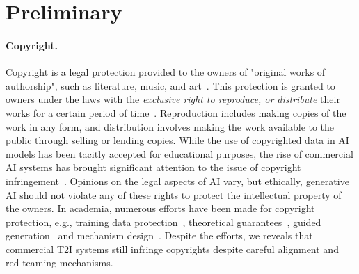 \vspace{-0.1in}
\section{Preliminary}
\vspace{-0.1in}
\paragraph{Copyright.}
Copyright is a legal protection provided to the owners of "original works of authorship", such as literature, music, and art~\citep{uscopyright2024uscopyright, uspto2024copyright}. This protection is granted to owners under the laws with the \textit{exclusive right to reproduce, or distribute} their works for a certain period of time~\citep{cornell106, uscopyright2024uscopyright}. Reproduction includes making copies of the work in any form, and distribution involves making the work available to the public through selling or lending copies. While the use of copyrighted data in AI models has been tacitly accepted for educational purposes, the rise of commercial AI systems has brought significant attention to the issue of copyright infringement~\citep{lawsuit1,lawsuit2NYTimes,lawsuit3Getty}. Opinions on the legal aspects of AI vary, but ethically, generative AI should not violate any of these rights to protect the intellectual property of the owners. 
In academia, numerous efforts have been made for copyright protection, e.g., training data protection~\citep{zhong2023copyright, shan2023glaze}, theoretical guarantees~\citep{bousquet2020synthetic, elkin2023can, vyas2023provable}, guided generation~\citep{schramowski2022safe, kumari2023ablating} and mechanism design~\citep{zhou2024plug, golatkar2024cpr, deng2024economic}. Despite the efforts, we reveals that commercial T2I systems still infringe copyrights despite careful alignment and red-teaming mechanisms. %

